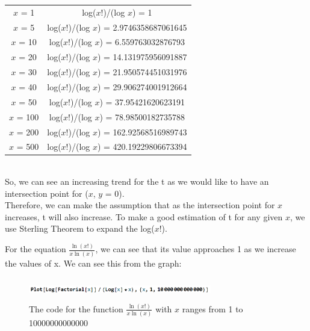 \documentclass{article}
\begin{document}
        \begin{tabular}{c c}
        $x$ = 1 & log($x$!)/(log $x$) = 1 \\
        $x$ = 5 & log($x$!)/(log $x$) = 2.9746358687061645 \\
        $x$ = 10 & log($x$!)/(log $x$) = 6.559763032876793 \\
        $x$ = 20 & log($x$!)/(log $x$) = 14.131975956091887 \\
        $x$ = 30 & log($x$!)/(log $x$) = 21.950574451031976 \\
        $x$ = 40 & log($x$!)/(log $x$) = 29.906274001912664 \\
        $x$ = 50 & log($x$!)/(log $x$) = 37.95421620623191 \\
        $x$ = 100 & log($x$!)/(log $x$) = 78.98500182735788 \\
        $x$ = 200 & log($x$!)/(log $x$) = 162.92568516989743 \\
        $x$ = 500 & log($x$!)/(log $x$) = 420.19229806673394 \\
        \end{tabular}\\
        So, we can see an increasing trend for the t as we would like to have an intersection point for ($x$, $y$ = 0).\\

        Therefore, we can make the assumption that as the intersection point for $x$ increases, t will also increase. To make a good estimation of t for any given $x$, we use Sterling Theorem to expand the log($x$!).\\

        \newpage
        
        For the equation $\frac{\ln(x!)}{x\ln(x)}$, we can see that its value approaches 1 as we increase the values of x. We can see this from the graph: \\ 


            \begin{figure}[h]
                \centering
                \includegraphics[width=8cm, height=1cm]{201.png}
                \caption{The code for the function $\frac{\ln(x!)}{x\ln(x)}$ with $x$ ranges from 1 to 10000000000000}
                \end{figure}
            
\end{document}
